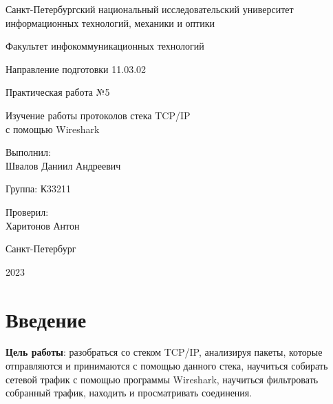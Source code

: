 \documentclass[a4paper, 14pt]{extarticle}
\begin{document}
\begin{titlepage}
  \vspace{0pt plus2fill}
  \noindent

  \vspace{0pt plus6fill}
  \begin{center}
    Санкт-Петербургский национальный исследовательский университет
    информационных технологий, механики и оптики

    \vspace{0pt plus2fill}

    Факультет инфокоммуникационных технологий

    Направление подготовки 11.03.02

    \vspace{0pt plus2fill}

    Практическая работа №5

    \vspace{0pt plus1fill}

    Изучение работы протоколов стека TCP/IP \\ с помощью Wireshark

  \end{center}

  \vspace{0pt plus7fill}
  \begin{flushright}
    Выполнил: \\
    Швалов Даниил Андреевич

    Группа: К33211

    Проверил: \\
    Харитонов Антон
  \end{flushright}

  \vspace{0pt plus2fill}
  \begin{center}
    Санкт-Петербург

    2023
  \end{center}
\end{titlepage}

\setcounter{page}{2}

\section{Введение}

\textbf{Цель работы}: разобраться со стеком TCP/IP, анализируя пакеты, которые
отправляются и принимаются с помощью данного стека, научиться собирать сетевой
трафик с помощью программы Wireshark, научиться фильтровать собранный трафик,
находить и просматривать соединения.
\end{document}
